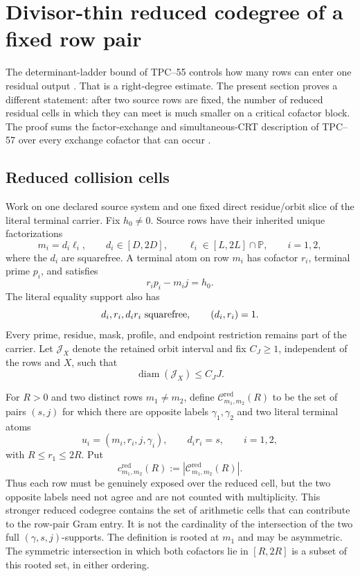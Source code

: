 \section{Divisor-thin reduced codegree of a fixed row pair}
\label{sec:tpc66-pair-codegree}

The determinant-ladder bound of TPC--55 controls how many rows can enter
one residual output \citep{WangTPC55}.  That is a right-degree estimate.
The present section proves a different statement: after two source rows
are fixed, the number of reduced residual cells in which they can meet is
much smaller on a critical cofactor block.  The proof sums the
factor-exchange and simultaneous-CRT description of TPC--57 over every
exchange cofactor that can occur \citep{WangTPC57}.

\subsection{Reduced collision cells}

Work on one declared source system and one fixed direct residue/orbit
slice of the literal terminal carrier.  Fix \(h_0\ne0\).  Source rows
have their inherited unique factorizations
\begin{equation}
 m_i=d_i\ell_i,\qquad
 d_i\in[D,2D],\qquad
 \ell_i\in[L,2L]\cap\mathbb P,
 \qquad i=1,2,
 \label{eq:tpc66-two-row-factorizations}
\end{equation}
where the \(d_i\) are squarefree.  A terminal atom on row \(m_i\) has
cofactor \(r_i\), terminal prime \(p_i\), and satisfies
\begin{equation}
 r_ip_i-m_ij=h_0.
 \label{eq:tpc66-two-terminal-equations-short}
\end{equation}
The literal equality support also has
\[
 d_i,r_i,d_ir_i\ \hbox{squarefree},
 \qquad (d_i,r_i)=1.
\]
Every prime, residue, mask, profile, and endpoint restriction remains
part of the carrier.
Let \(\mathcal J_X\) denote the retained orbit interval and fix
\(C_J\ge1\), independent of the rows and \(X\), such that
\[
 \operatorname{diam}(\mathcal J_X)\le C_JJ.
\]

For \(R>0\) and two distinct rows \(m_1\ne m_2\), define
\(\mathcal C^{\mathrm{red}}_{m_1,m_2}(R)\) to be the set of pairs
\((s,j)\) for which there are opposite labels \(\gamma_1,\gamma_2\) and two
literal terminal atoms
\[
 u_i=(m_i,r_i,j,\gamma_i),\qquad d_ir_i=s,\qquad i=1,2,
\]
with \(R\le r_1\le2R\).  Put
\begin{equation}
 c^{\mathrm{red}}_{m_1,m_2}(R)
 :=\left|\mathcal C^{\mathrm{red}}_{m_1,m_2}(R)\right|.
 \label{eq:tpc66-reduced-codegree}
\end{equation}
Thus each row must be genuinely exposed over the reduced cell, but the two
opposite labels need not agree and are not counted with multiplicity. This
stronger reduced codegree contains the set of arithmetic cells that can
contribute to the row-pair Gram entry. It is not the cardinality of the
intersection of the two full \((\gamma,s,j)\)-supports.
The definition is rooted at \(m_1\) and may be asymmetric.  The symmetric
intersection in which both cofactors lie in \([R,2R]\) is a subset of this
rooted set, in either ordering.

